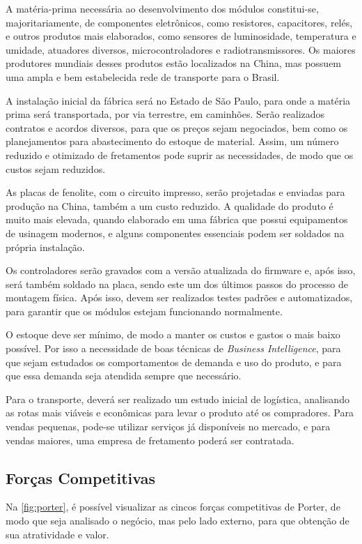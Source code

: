 A matéria-prima necessária ao desenvolvimento dos módulos constitui-se, majoritariamente, de componentes eletrônicos, como resistores, capacitores, relés, e outros produtos mais elaborados, como sensores de luminosidade, temperatura e umidade, atuadores diversos, microcontroladores  e radiotransmissores. Os maiores produtores mundiais desses produtos estão localizados na China, mas possuem uma ampla e bem estabelecida rede de transporte para o Brasil.

A instalação inicial da fábrica será no Estado de São Paulo, para onde a matéria prima será transportada, por via terrestre, em caminhões. Serão realizados contratos e acordos diversos, para que os preços sejam negociados, bem como os planejamentos para abastecimento do estoque de material. Assim, um número reduzido e otimizado de fretamentos pode suprir as necessidades, de modo que os custos sejam reduzidos.

As placas de fenolite, com o circuito impresso, serão projetadas e enviadas para produção na China, também a um custo reduzido. A qualidade do produto é muito mais elevada, quando elaborado em uma fábrica que possui equipamentos de usinagem modernos, e alguns componentes essenciais podem ser soldados na própria instalação.

Os controladores serão gravados com a versão atualizada do firmware e, após isso, será também soldado na placa, sendo este um dos últimos passos do processo de montagem física. Após isso, devem ser realizados testes padrões e automatizados, para garantir que os módulos estejam funcionando normalmente.

O estoque deve ser mínimo, de modo a manter os custos e gastos o mais baixo possível. Por isso a necessidade de boas técnicas de \emph{Business Intelligence}, para que sejam estudados os comportamentos de demanda e uso do produto, e para que essa demanda seja atendida sempre que necessário.

Para o transporte, deverá ser realizado um estudo inicial de logística, analisando as rotas mais viáveis e econômicas para levar o produto até os compradores. Para vendas pequenas, pode-se utilizar serviços já disponíveis no mercado, e para vendas maiores, uma empresa de fretamento poderá ser contratada.

\subsection{Forças Competitivas}

Na \autoref{fig:porter}, é possível visualizar as cincos forças competitivas de Porter, de modo que seja analisado o negócio, mas pelo lado externo, para que obtenção de sua atratividade e valor.

